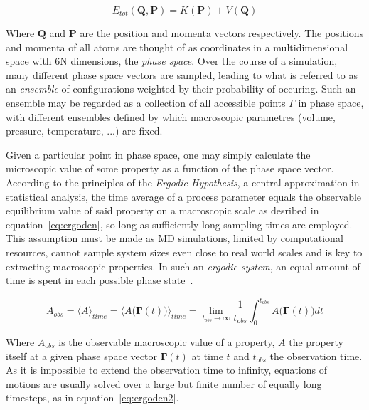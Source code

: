\documentclass[11pt]{article}
\begin{document}
\begin{equation}
  E_{tot}(\textbf{Q}, \textbf{P}) = K(\textbf{P}) + V(\textbf{Q})
  \label{eq:total}
\end{equation}

\bigskip

\noindent Where $\textbf{Q}$ and $\textbf{P}$ are the position and momenta vectors respectively.
The positions and momenta of all atoms are thought of as coordinates in a multidimensional space with 6N dimensions, the \textit{phase space}. Over the course of a simulation, many different phase space vectors are sampled, leading to what is referred to as an \textit{ensemble} of configurations weighted by their probability of occuring. Such an ensemble may be regarded as a collection of all accessible points $\Gamma$ in phase space, with different ensembles defined by which macroscopic parametres (volume, pressure, temperature,  ...) are fixed.
\\ \par \noindent
Given a particular point in phase space, one may simply calculate the microscopic value of some property as a function of the phase space vector. According to the principles of the \textit{Ergodic Hypothesis}, a central approximation in statistical analysis, the time average of a process parameter equals the observable equilibrium value of said property on a macroscopic scale as desribed in equation~\ref{eq:ergoden}, so long as sufficiently long sampling times are employed. This assumption must be made as MD simulations, limited by computational resources, cannot sample system sizes even close to real world scales and is key to extracting macroscopic properties. In such an \textit{ergodic system}, an equal amount of time is spent in each possible phase state~\cite{Gupta1990-au}.

\begin{equation}
  A_{obs} = \langle A  \rangle_{time} = \bigl\langle A \bigl(\mathbf{\Gamma}(t)\bigr) \bigl\rangle_{time} = \lim_{t_{obs} \to \infty} \frac{1}{t_{obs}}\int_{0}^{t_{obs}}A\bigl(\mathbf{\Gamma}(t)\bigr)dt
  \label{eq:ergoden}
\end{equation}

\bigskip

\noindent Where $A_{obs}$ is the observable macroscopic value of a property, $A$ the property itself at a given phase space vector $\mathbf{\Gamma}(t)$ at time $t$ and $t_{obs}$ the observation time. As it is impossible to extend the observation time to infinity, equations of motions are usually solved over a large but finite number of equally long timesteps, as in equation~\ref{eq:ergoden2}.
\end{document}

